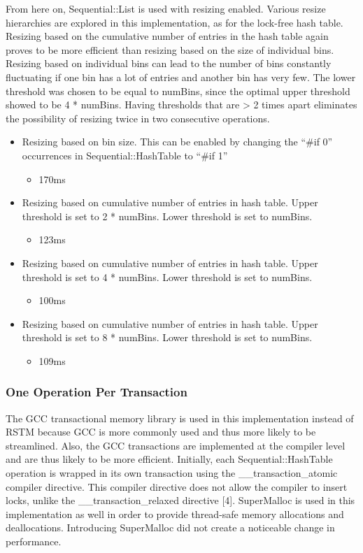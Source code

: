 \documentclass[11pt]{article} %
\begin{document}
From here on, Sequential::List is used with resizing enabled. Various resize hierarchies are explored in this implementation, as for the lock-free hash table. Resizing based on the cumulative number of entries in the hash table again proves to be more efficient than resizing based on the size of individual bins. Resizing based on individual bins can lead to the number of bins constantly fluctuating if one bin has a lot of entries and another bin has very few. The lower threshold was chosen to be equal to numBins, since the optimal upper threshold showed to be 4 * numBins. Having thresholds that are > 2 times apart eliminates the possibility of resizing twice in two consecutive operations.

\begin{itemize}
	\item Resizing based on bin size. This can be enabled by changing the “\#if 0” occurrences in Sequential::HashTable to “\#if 1”
	\begin{itemize}
    		\item 170ms
	\end{itemize}
	\item Resizing based on cumulative number of entries in hash table. Upper threshold is set to 2 * numBins. Lower threshold is set to numBins.
	\begin{itemize}
		\item 123ms
	\end{itemize}
	\item Resizing based on cumulative number of entries in hash table. Upper threshold is set to 4 * numBins. Lower threshold is set to numBins.
	\begin{itemize}
		\item 100ms
	\end{itemize}
	\item Resizing based on cumulative number of entries in hash table. Upper threshold is set to 8 * numBins. Lower threshold is set to numBins.
	\begin{itemize}
		\item 109ms
	\end{itemize}
\end{itemize}

\subsubsection{One Operation Per Transaction}

The GCC transactional memory library is used in this implementation instead of RSTM because GCC is more commonly used and thus more likely to be streamlined. Also, the GCC transactions are implemented at the compiler level and are thus likely to be more efficient. Initially, each Sequential::HashTable operation is wrapped in its own transaction using the \_\_transaction\_atomic compiler directive. This compiler directive does not allow the compiler to insert locks, unlike the \_\_transaction\_relaxed directive [4]. SuperMalloc is used in this implementation as well in order to provide thread-safe memory allocations and deallocations. Introducing SuperMalloc did not create a noticeable change in performance.
\end{document}
